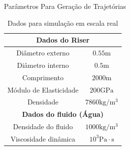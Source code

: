 \documentclass[10pt]{beamer}
\begin{document}
\begin{frame}[fragile]{Parâmetros Para Geração de Trajetórias}
\begin{table}[!ht]
\centering
\caption{Dados para simulação em escala real\label{escalaReal} \cite{redytton}}
	\begin{tabular}{|c|c|}
	\hline
		\multicolumn{2}{|c|}{\textbf{Dados do Riser}}\\ \hline
		Diâmetro externo & $0.55\mathrm{m}$\\ \hline
		Diâmetro interno & $0.5\mathrm{m}$ \\ \hline
		Comprimento & $2000\mathrm{m}$ \\ \hline
		Módulo de Elasticidade & $200 \mathrm{GPa}$\\ \hline
		Densidade &  $7860\mathrm{kg}/\mathrm{m}^3$\\ \hline
		\multicolumn{2}{|c|}{\textbf{Dados do fluido (Água)}}\\ \hline
		Densidade do fluido &  $1000\mathrm{kg}/\mathrm{m}^3$\\ \hline
		Viscosidade dinâmica & $10^3 \mathrm{Pa}\cdot \mathrm{s}$ \\ \hline
	\end{tabular}



\end{table}

\end{frame}
\end{document}

